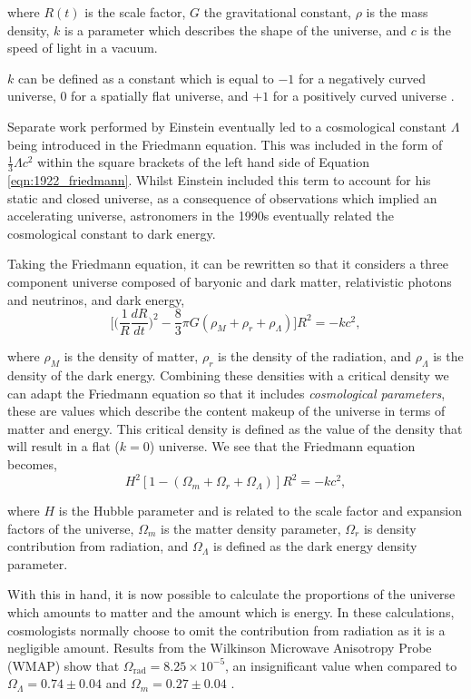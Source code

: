 \documentclass[twocolumn]{revtex4}
\begin{document}
where $R(t)$ is the scale factor, $G$ the gravitational constant, $\rho$ is the mass density, $k$ is a parameter which describes the shape of the universe, and $c$ is the speed of light in a vacuum.

$k$ can be defined as a constant which is equal to $-1$ for a negatively curved universe, $0$ for a spatially flat universe, and $+1$ for a positively curved universe \cite{longair}. 

Separate work performed by Einstein eventually led to a cosmological constant $\Lambda$ being introduced in the Friedmann equation. This was included in the form of $\tfrac{1}{3}\Lambda c^2$ within the square brackets of the left hand side of Equation \ref{eqn:1922_friedmann}. Whilst Einstein included this term to account for his static and closed universe, as a consequence of observations which implied an accelerating universe, astronomers in the 1990s eventually related the cosmological constant to dark energy.

Taking the Friedmann equation, it can be rewritten so that it considers a three component universe composed of baryonic and dark matter, relativistic photons and neutrinos, and dark energy, 
\begin{equation}
\Big[ \Big( \frac{1}{R} \frac{dR}{dt} \Big)^2 - \frac{8}{3} \pi G (\rho_{M} + \rho_{r} + \rho_{\Lambda} )\Big] R^2 = -kc^2,
\end{equation}

where $\rho_{M}$ is the density of matter, $\rho_{r}$ is the density of the radiation, and $\rho_{\Lambda}$ is the density of the dark energy. Combining these densities with a critical density we can adapt the Friedmann equation so that it includes \textit{cosmological parameters}, these are values which describe the content makeup of the universe in terms of matter and energy. This critical density is defined as the value of the density that will result in a flat ($k=0$) universe. We see that the Friedmann equation becomes,
\begin{equation}
H^2 [1-(\Omega_m + \Omega_{r} + \Omega_{\Lambda})]R^2 = -kc^2,
\label{eqn:friedmann_old}
\end{equation}

where $H$ is the Hubble parameter and is related to the scale factor and expansion factors of the universe, $\Omega_m$ is the matter density parameter, $\Omega_{r}$ is density contribution from radiation, and $\Omega_{\Lambda}$ is defined as the dark energy density parameter.

With this in hand, it is now possible to calculate the proportions of the universe which amounts to matter and the amount which is energy. In these calculations, cosmologists normally choose to omit the contribution from radiation as it is a negligible amount. Results from the Wilkinson Microwave Anisotropy Probe (WMAP) show that $\Omega_{\text{rad}}=8.25 \times 10^{-5}$, an insignificant value when compared to $\Omega_{\Lambda}=0.74 \pm 0.04$ and $\Omega_m = 0.27 \pm 0.04$ \cite{mod_ast}. 
\end{document}
